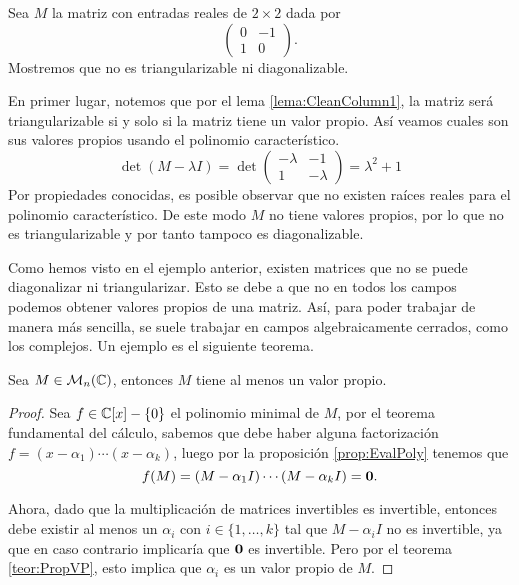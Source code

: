 \begin{example}
  Sea $M$ la matriz con entradas reales de $2\times 2$ dada por 
  \[ \begin{pmatrix} 0 & -1 \\ 1 & 0 \end{pmatrix}. \]
  Mostremos que no es triangularizable ni diagonalizable.

  \examplesolution

  En primer lugar, notemos que por el lema \ref{lema:CleanColumn1}, la matriz será triangularizable si y solo si la matriz tiene un valor propio. Así veamos cuales son sus valores propios usando el polinomio característico.
    \[
      \det(M-\lambda I) = \det \begin{pmatrix} - \lambda & -1 \\ 1 & - \lambda \end{pmatrix}
        = \lambda^2  + 1
    \]
  Por propiedades conocidas, es posible observar que no existen raíces reales para el polinomio característico. De este modo $M$ no tiene valores propios, por lo que no es triangularizable y por tanto tampoco es diagonalizable.
\end{example}

Como hemos visto en el ejemplo anterior, existen matrices que no se puede diagonalizar ni triangularizar. Esto se debe a que no en todos los campos podemos obtener valores propios de una matriz. Así, para poder trabajar de manera más sencilla, se suele trabajar en campos algebraicamente cerrados, como los complejos. Un ejemplo es el siguiente teorema.

\begin{prop}\label{prop:MComplexHasEV}
  Sea $M \in  \mathcal{M}_n(\mathbb{C})$, entonces $M$ tiene al menos un valor propio.
\end{prop}
\begin{proof}
  Sea $f \in \mathbb{C}[x]-\{0\}$ el polinomio minimal de $M$, por el teorema fundamental del cálculo, sabemos que debe haber alguna factorización $f = (x-\alpha_1)\cdots(x-\alpha_k)$, luego por la proposición \ref{prop:EvalPoly} tenemos que
  \[ f(M) = (M-\alpha_1 I)\cdots(M-\alpha_k I) = \mathbf{0}.\]

  Ahora, dado que la multiplicación de matrices invertibles es invertible, entonces debe existir al menos un $\alpha_i$ con $i \in \{1,\ldots,k\}$ tal que $M-\alpha_i I$ no es invertible, ya que en caso contrario implicaría que $\mathbf{0}$ es invertible. Pero por el teorema \ref{teor:PropVP}, esto implica que $\alpha_i$ es un valor propio de $M$.
\end{proof}

